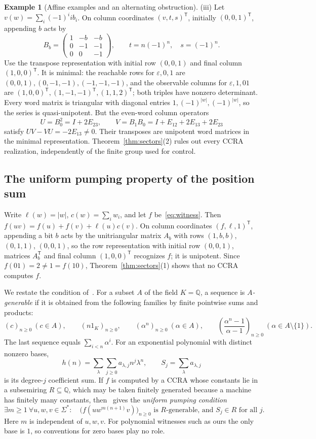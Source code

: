 \documentclass[11pt,letterpaper]{article}
\newcommand{\Q}{\mathbb{Q}}
\newcommand{\eps}{\varepsilon}
\theoremstyle{definition}
\newtheorem{example}[theorem]{Example}
\begin{document}
\begin{example}[Affine examples and an alternating obstruction]
(iii) Let $v(w)=\sum_i(-1)^ii b_i$. On column coordinates $(v,t,s)^{\mathsf T}$, initially $(0,0,1)^{\mathsf T}$, appending $b$ acts by
\[
B_b=\begin{pmatrix}1&-b&-b\\0&-1&-1\\0&0&-1\end{pmatrix},
\qquad t=n(-1)^n,\quad s=(-1)^n.
\]
Use the transpose representation with initial row $(0,0,1)$ and final column $(1,0,0)^{\mathsf T}$. It is minimal: the reachable rows for $\eps,0,1$ are $(0,0,1),(0,-1,-1),(-1,-1,-1)$, and the observable columns for $\eps,1,01$ are $(1,0,0)^{\mathsf T},(1,-1,-1)^{\mathsf T},(1,1,2)^{\mathsf T}$; both triples have nonzero determinant. Every word matrix is triangular with diagonal entries $1,(-1)^{|w|},(-1)^{|w|}$, so the series is quasi-unipotent. But the even-word column operators
\[
U=B_0^2=I+2E_{23},\qquad V=B_1B_0=I+E_{12}+2E_{13}+2E_{23}
\]
satisfy $UV-VU=-2E_{13}\ne0$. Their transposes are unipotent word matrices in the minimal representation. Theorem~\ref{thm:sectors}(2) rules out every CCRA realization, independently of the finite group used for control.
\end{example}

\subsection{The uniform pumping property of the position sum}
Write $\ell(w)=|w|$, $c(w)=\sum_iw_i$, and let $f$ be~\eqref{eq:witness}. Then $f(uv)=f(u)+f(v)+\ell(u)c(v)$. On column coordinates $(f,\ell,1)^\mathsf{T}$, appending a bit $b$ acts by the unitriangular matrix $A_b$ with rows $(1,b,b)$, $(0,1,1)$, $(0,0,1)$, so the row representation with initial row $(0,0,1)$, matrices $A_b^{\mathsf T}$ and final column $(1,0,0)^{\mathsf T}$ recognizes $f$; it is unipotent. Since $f(01)=2\ne1=f(10)$, Theorem~\ref{thm:sectors}(1) shows that no CCRA computes $f$.

We restate the condition of~\cite[Definition~11 and Theorem~15]{MPS26}. For a subset $A$ of the field $K=\Q$, a sequence is \emph{$A$-generable} if it is obtained from the following families by finite pointwise sums and products:
\[
(c)_{n\ge0}\ (c\in A),\qquad(n1_K)_{n\ge0},\qquad
(\alpha^n)_{n\ge0}\ (\alpha\in A),\qquad
\left(\frac{\alpha^n-1}{\alpha-1}\right)_{n\ge0}\ (\alpha\in A\setminus\{1\}).
\]
The last sequence equals $\sum_{i<n}\alpha^i$. For an exponential polynomial with distinct nonzero bases,
\[
h(n)=\sum_{\lambda}\sum_{j\ge0}a_{\lambda,j}n^j\lambda^n,
\qquad S_j=\sum_{\lambda}a_{\lambda,j}
\]
is its degree-$j$ coefficient sum. If $f$ is computed by a CCRA whose constants lie in a subsemiring $R\subseteq\Q$, which may be taken finitely generated because a machine has finitely many constants, then~\cite[Theorem~15]{MPS26} gives the \emph{uniform pumping condition}
\[
\exists m\ge1\ \forall u,w,v\in\Sigma^*:\quad
\bigl(f(uw^{m(n+1)}v)\bigr)_{n\ge0}\text{ is $R$-generable, and }S_j\in R\text{ for all }j.
\]
Here $m$ is independent of $u,w,v$. For polynomial witnesses such as ours the only base is $1$, so conventions for zero bases play no role.
\end{document}
